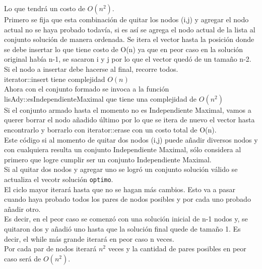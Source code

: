 Lo que tendr\'a un costo de $O(n^2)$.\\

Primero se fija que esta combinaci\'on de quitar los nodos (i,j) y agregar el nodo actual no se haya probado todav\'ia, si es as\'i se agrega el nodo actual de la lista al conjunto soluci\'on de manera ordenada. Se itera el vector hasta la posici\'on donde se debe insertar lo que tiene costo de O(n) ya que en peor caso en la soluci\'on original hab\'ia n-1, se sacaron i y j por lo que el vector qued\'o de un tama\~	no n-2. Si el nodo a insertar debe hacerse al final, recorre todos.\\

iterator::insert tiene complejidad $O(n)$\\

Ahora con el conjunto formado se invoca a la funci\'on lisAdy::esIndependienteMaximal que tiene una complejidad de $O(n^2)$\\

Si el conjunto armado hasta el momento no es Independiente Maximal, vamos a querer borrar el nodo a\~nadido \'ultimo por lo que se itera de nuevo el vector hasta encontrarlo y borrarlo con iterator::erase con un costo total de O(n).\\

Este c\'odigo si al momento de quitar dos nodos (i,j) puede a\~nadir diversos nodos y con cualquiera resulta un conjunto Independiente Maximal, s\'olo considera al primero que logre cumplir ser un conjunto Independiente Maximal.\\

Si al quitar dos nodos y agregar uno se logr\'o un conjunto soluci\'on v\'alido se actualiza el vecotr soluci\'on \texttt{optimo}.\\

El ciclo mayor iterar\'a hasta que no se hagan m\'as cambios. Esto va a pasar cuando haya probado todos los pares de nodos posibles y por cada uno probado a\~nadir otro.\\

Es decir, en el peor caso se comenz\'o con una soluci\'on inicial de n-1 nodos y, se quitaron dos y a\~nadi\'o uno hasta que la soluci\'on final quede de tama\~no 1. Es decir, el while m\'as grande iterar\'a en peor caso n veces.\\

Por cada par de nodos iterar\'a $n^2$ veces y la cantidad de pares posibles en peor caso ser\'a de $O(n^2)$.\\

